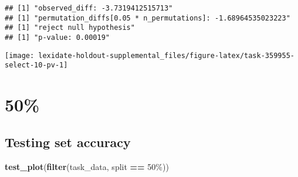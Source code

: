 \documentclass[
]{book}
\newenvironment{Shaded}{\begin{snugshade}}{\end{snugshade}}
\newcommand{\AttributeTok}[1]{\textcolor[rgb]{0.13,0.29,0.53}{#1}}
\newcommand{\DecValTok}[1]{\textcolor[rgb]{0.00,0.00,0.81}{#1}}
\newcommand{\FunctionTok}[1]{\textcolor[rgb]{0.13,0.29,0.53}{\textbf{#1}}}
\newcommand{\NormalTok}[1]{#1}
\newcommand{\OtherTok}[1]{\textcolor[rgb]{0.56,0.35,0.01}{#1}}
\newcommand{\SpecialCharTok}[1]{\textcolor[rgb]{0.81,0.36,0.00}{\textbf{#1}}}
\newcommand{\StringTok}[1]{\textcolor[rgb]{0.31,0.60,0.02}{#1}}
\begin{document}
\begin{Shaded}
\end{Shaded}

\begin{verbatim}
## [1] "observed_diff: -3.7319412515713"
## [1] "permutation_diffs[0.05 * n_permutations]: -1.68964535023223"
## [1] "reject null hypothesis"
## [1] "p-value: 0.00019"
\end{verbatim}

\texttt{[image: lexidate-holdout-supplemental\_files/figure-latex/task-359955-select-10-pv-1]}

\hypertarget{section-12}{%
\section{50\%}\label{section-12}}

\hypertarget{testing-set-accuracy-12}{%
\subsection{Testing set accuracy}\label{testing-set-accuracy-12}}

\begin{Shaded}
\begin{Highlighting}[]
\FunctionTok{test\_plot}\NormalTok{(}\FunctionTok{filter}\NormalTok{(task\_data, split }\SpecialCharTok{==} \StringTok{\textquotesingle{}50\%\textquotesingle{}}\NormalTok{))}
\end{Highlighting}
\end{Shaded}
\end{document}
